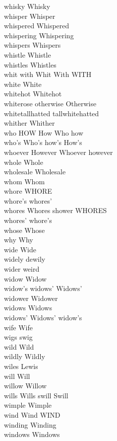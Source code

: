 whisky Whisky\\
whisper Whisper\\
whispered Whispered\\
whispering Whispering\\
whispers Whispers\\
whistle Whistle\\
whistles Whistles\\
whit with Whit With WITH\\
white White\\
whitehot Whitehot\\
whiterose otherwise Otherwise\\
whitetallhatted tallwhitehatted\\
whither Whither\\
who HOW How Who how\\
who's Who's how's How's\\
whoever However Whoever however\\
whole Whole\\
wholesale Wholesale\\
whom Whom\\
whore WHORE\\
whore's whores'\\
whores Whores shower WHORES\\
whores' whore's\\
whose Whose\\
why Why\\
wide Wide\\
widely dewily\\
wider weird\\
widow Widow\\
widow's widows' Widows'\\
widower Widower\\
widows Widows\\
widows' Widows' widow's\\
wife Wife\\
wigs swig\\
wild Wild\\
wildly Wildly\\
wiles Lewis\\
will Will\\
willow Willow\\
wills Wills swill Swill\\
wimple Wimple\\
wind Wind WIND\\
winding Winding\\
windows Windows\\
